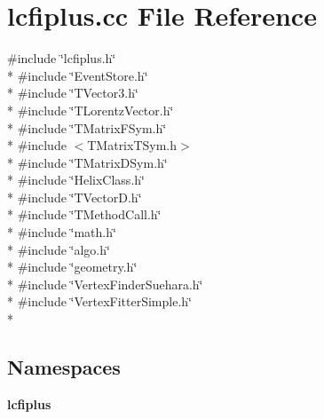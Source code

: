 \section{lcfiplus.\-cc File Reference}
\label{lcfiplus_8cc}
{\ttfamily \#include \char`\"{}lcfiplus.\-h\char`\"{}}\\*
{\ttfamily \#include \char`\"{}Event\-Store.\-h\char`\"{}}\\*
{\ttfamily \#include \char`\"{}T\-Vector3.\-h\char`\"{}}\\*
{\ttfamily \#include \char`\"{}T\-Lorentz\-Vector.\-h\char`\"{}}\\*
{\ttfamily \#include \char`\"{}T\-Matrix\-F\-Sym.\-h\char`\"{}}\\*
{\ttfamily \#include $<$T\-Matrix\-T\-Sym.\-h$>$}\\*
{\ttfamily \#include \char`\"{}T\-Matrix\-D\-Sym.\-h\char`\"{}}\\*
{\ttfamily \#include \char`\"{}Helix\-Class.\-h\char`\"{}}\\*
{\ttfamily \#include \char`\"{}T\-Vector\-D.\-h\char`\"{}}\\*
{\ttfamily \#include \char`\"{}T\-Method\-Call.\-h\char`\"{}}\\*
{\ttfamily \#include \char`\"{}math.\-h\char`\"{}}\\*
{\ttfamily \#include \char`\"{}algo.\-h\char`\"{}}\\*
{\ttfamily \#include \char`\"{}geometry.\-h\char`\"{}}\\*
{\ttfamily \#include \char`\"{}Vertex\-Finder\-Suehara.\-h\char`\"{}}\\*
{\ttfamily \#include \char`\"{}Vertex\-Fitter\-Simple.\-h\char`\"{}}\\*
\subsection*{Namespaces}
\begin{DoxyCompactItemize}
\item 
{\bf lcfiplus}
\end{DoxyCompactItemize}

